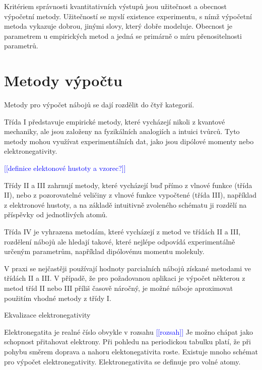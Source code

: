 \documentclass[
  color, %
  table, %
  lof,   %
  lot,   %
]{fithesis3}
\newcommand\todo[1]{\textcolor{blue}{[[#1]]}}
\begin{document}


Kritériem správnosti kvantitativních výstupů jsou užitečnost a obecnost výpočetní metody. Užitečností se myslí existence experimentu, s nímž výpočetní metoda vykazuje dobrou, jinými slovy, který dobře modeluje. Obecnost je parametrem u empirických metod a jedná se primárně o míru přenositelnosti parametrů.

\section{Metody výpočtu}

Metody pro výpočet nábojů se dají rozdělit do čtyř kategorií. \citep[s.~50]{cramer2004essentials}

Třída I představuje empirické metody, které vycházejí nikoli z kvantové mechaniky, ale jsou založeny na fyzikálních analogiích a intuici tvůrců. Tyto metody mohou využívat experimentálních dat, jako jsou dipólové momenty nebo elektronegativity.

\todo{definice elektonové hustoty a vzorec?}

Třídy II a III zahrnují metody, které vycházejí buď přímo z vlnové funkce (třída II), nebo z pozorovatelné veličiny z vlnové funkce vypočtené (třída III), například z elektronové hustoty, a na základě intuitivně zvoleného schématu ji rozdělí na příspěvky od jednotlivých atomů.

Třída IV je vyhrazena metodám, které vycházejí z metod ve třídách II a III, rozdělení nábojů ale hledají takové, které nejlépe odpovídá experimentálně určeným parametrům, například dipólovému momentu molekuly.

V praxi se nejčastěji používají hodnoty parcialních nábojů získané metodami ve třídách II a III. V případě, že pro požadovanou aplikaci je výpočet některou z metod tříd II nebo III příliš časově náročný, je možné náboje aproximovat použitím vhodné metody z třídy I.

Ekvalizace elektronegativity

Elektronegatita je realné číslo obvykle v rozsahu \todo{rozsah} Je možno chápat jako schopnost přitahovat elektrony. Při pohledu na periodickou tabulku platí, že při pohybu směrem doprava a nahoru elektonegativita roste. Existuje mnoho schémat pro výpočet elektronegativity. Elektronegativita se definuje pro volné atomy.
\end{document}
